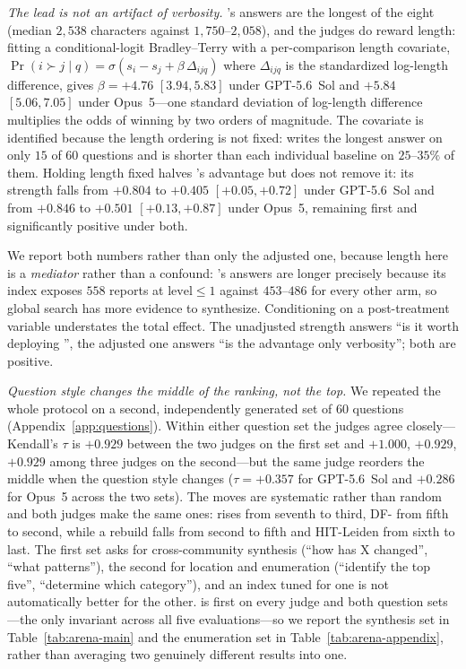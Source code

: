 \emph{The lead is not an artifact of verbosity.} \DyLo{}'s answers are the
longest of the eight (median $2{,}538$ characters against $1{,}750$--$2{,}058$),
and the judges do reward length: fitting a conditional-logit Bradley--Terry with
a per-comparison length covariate,
$\Pr(i \succ j \mid q) = \sigma(s_i - s_j + \beta\,\Delta_{ijq})$ where
$\Delta_{ijq}$ is the standardized log-length difference, gives
$\beta = +4.76$ $[3.94,5.83]$ under GPT-5.6~Sol and $+5.84$ $[5.06,7.05]$ under
Opus~5---one standard deviation of log-length difference multiplies the odds of
winning by two orders of magnitude. The covariate is identified because the
length ordering is not fixed: \DyLo{} writes the longest answer on only $15$ of
$60$ questions and is shorter than each individual baseline on $25$--$35\%$ of
them. Holding length fixed halves \DyLo{}'s advantage but does not remove it:
its strength falls from $+0.804$ to $+0.405$ $[+0.05,+0.72]$ under GPT-5.6~Sol
and from $+0.846$ to $+0.501$ $[+0.13,+0.87]$ under Opus~5, remaining first and
significantly positive under both.

We report both numbers rather than only the adjusted one, because length here is
a \emph{mediator} rather than a confound: \DyLo{}'s answers are longer precisely
because its index exposes $558$ reports at $\mathrm{level}\le 1$ against
$453$--$486$ for every other arm, so global search has more evidence to
synthesize. Conditioning on a post-treatment variable understates the total
effect. The unadjusted strength answers ``is it worth deploying \DyLo{}'', the
adjusted one answers ``is the advantage only verbosity''; both are positive.

\emph{Question style changes the middle of the ranking, not the top.}
We repeated the whole protocol on a second, independently generated set of $60$
questions (Appendix~\ref{app:questions}). Within either question set the judges
agree closely---Kendall's $\tau$ is $+0.929$ between the two judges on the first
set and $+1.000$, $+0.929$, $+0.929$ among three judges on the second---but the
same judge reorders the middle when the question style changes
($\tau = +0.357$ for GPT-5.6~Sol and $+0.286$ for Opus~5 across the two sets).
The moves are systematic rather than random and both judges make the same ones:
\QCA{} rises from seventh to third, DF-\Louvain{} from fifth to second, while a
rebuild falls from second to fifth and HIT-Leiden from sixth to last. The first
set asks for cross-community synthesis (``how has X changed'', ``what patterns''),
the second for location and enumeration (``identify the top five'', ``determine
which category''), and an index tuned for one is not automatically better for
the other. \DyLo{} is first on every judge and both question sets---the only
invariant across all five evaluations---so we report the synthesis set in
Table~\ref{tab:arena-main} and the enumeration set in
Table~\ref{tab:arena-appendix}, rather than averaging two genuinely different
results into one.


